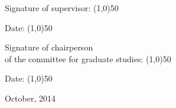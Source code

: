 \documentclass[ twoside, 12pt ]{article}
\begin{document}
\begin{titlepage}
\begin{center}
        \begin{minipage}{0.4\textwidth}
        \end{minipage}
        
        \begin{minipage}{0.8\textwidth}
            \begin{flushleft}
                Signature of supervisor: \line(1,0){50}
            \end{flushleft}
        \end{minipage}
        \begin{minipage}{0.19\textwidth}
            \begin{flushright}
                Date: \line(1,0){50}
            \end{flushright}
        \end{minipage}
        
        \begin{minipage}{0.4\textwidth}
        \end{minipage}
        
        \begin{minipage}{0.8\textwidth}
            \begin{flushleft}
                Signature of chairperson\\
                of the committee for graduate studies: \line(1,0){50}
            \end{flushleft}
        \end{minipage}
        \begin{minipage}{0.19\textwidth}
            \begin{flushright}
                Date: \line(1,0){50}
            \end{flushright}
        \end{minipage}
        
        \begin{minipage}{0.4\textwidth}
        \end{minipage}
        
        \vspace{2cm}
        October, 2014 \\[1.5cm]
        
        
        
        
    \end{center}
\end{titlepage}
\end{document}
